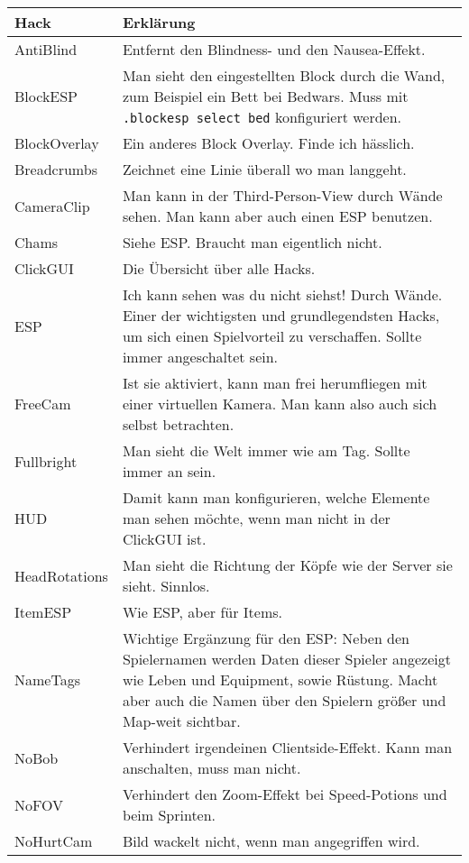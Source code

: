 \begin{longtable}{p{3cm}|p{10cm}}
\textbf{Hack} & \textbf{Erklärung} \\
\hline
\rowcolor{lime!50}AntiBlind & Entfernt den Blindness- und den Nausea-Effekt. \\
\hline
\rowcolor{lime!50}BlockESP & Man sieht den eingestellten Block durch die Wand, zum Beispiel ein Bett bei Bedwars. Muss mit \texttt{.blockesp select bed} konfiguriert werden. \\
\hline
BlockOverlay & Ein anderes Block Overlay. Finde ich hässlich. \\
\hline
Breadcrumbs & Zeichnet eine Linie überall wo man langgeht. \\
\hline
CameraClip & Man kann in der Third-Person-View durch Wände sehen. Man kann aber auch einen ESP benutzen. \\
\hline
Chams & Siehe ESP. Braucht man eigentlich nicht. \\
\hline
\rowcolor{lime!50}ClickGUI & Die Übersicht über alle Hacks. \\
\hline
\rowcolor{lime!50}ESP & Ich kann sehen was du nicht siehst! Durch Wände. Einer der wichtigsten und grundlegendsten Hacks, um sich einen Spielvorteil zu verschaffen. Sollte immer angeschaltet sein. \\
\hline
FreeCam & Ist sie aktiviert, kann man frei herumfliegen mit einer virtuellen Kamera. Man kann also auch sich selbst betrachten. \\
\hline
\rowcolor{lime!50}Fullbright & Man sieht die Welt immer wie am Tag. Sollte immer an sein. \\
\hline
HUD & Damit kann man konfigurieren, welche Elemente man sehen möchte, wenn man nicht in der ClickGUI ist. \\
\hline
HeadRotations & Man sieht die Richtung der Köpfe wie der Server sie sieht. Sinnlos. \\
\hline
\rowcolor{lime!50}ItemESP & Wie ESP, aber für Items. \\
\hline
\rowcolor{lime!50}NameTags & Wichtige Ergänzung für den ESP: Neben den Spielernamen werden Daten dieser Spieler angezeigt wie Leben und Equipment, sowie Rüstung. Macht aber auch die Namen über den Spielern größer und Map-weit sichtbar. \\
\hline
NoBob & Verhindert irgendeinen Clientside-Effekt. Kann man anschalten, muss man nicht. \\
\hline
NoFOV & Verhindert den Zoom-Effekt bei Speed-Potions und beim Sprinten. \\
\hline
NoHurtCam & Bild wackelt nicht, wenn man angegriffen wird. \\

\end{longtable}
